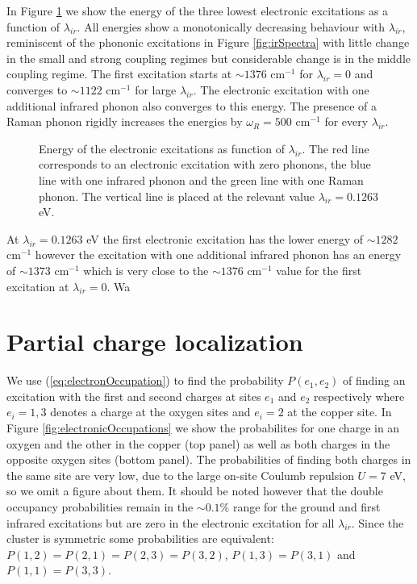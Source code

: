 In Figure \ref{fig:electrSpectra} we show the energy of the three lowest electronic excitations as a function of $\lambda_{ir}$.
All energies show a monotonically decreasing behaviour with $\lambda_{ir}$, reminiscent of the phononic excitations in Figure \ref{fig:irSpectra} with little change in the small and strong coupling regimes but considerable change is in the middle coupling regime.
The first excitation starts at $\sim 1376$ cm$^{-1}$ for $\lambda_{ir}=0$ and converges to $\sim 1122$ cm$^{-1}$ for large $\lambda_{ir}$.
The electronic excitation with one additional infrared phonon also converges to this energy.
The presence of a Raman phonon rigidly increases the energies by $\omega_R=500$ cm$^{-1}$ for every $\lambda_{ir}$.
%
\begin{figure}[ht]
  \centering
  
  \caption[Energy of the electronic excitations as function of $\lambda_{ir}$.]
  {Energy of the electronic excitations as function of $\lambda_{ir}$. 
    The red line corresponds to an electronic excitation with zero phonons, the blue line with one infrared phonon and the green line with one Raman phonon.
    The vertical line is placed at the relevant value $\lambda_{ir}=0.1263$ eV.}
  \label{fig:electrSpectra}
\end{figure}

At $\lambda_{ir}=0.1263$ eV the first electronic excitation has the lower energy of $\sim 1282$ cm$^{-1}$ however the excitation with one additional infrared phonon has an energy of $\sim 1373$ cm$^{-1}$ which is very close to the $\sim 1376$ cm$^{-1}$ value for the first excitation at $\lambda_{ir}=0$.
Wa
\section{Partial charge localization}
\label{sec:partialChargeLocalization}

We use (\ref{eq:electronOccupation}) to find the probability $P(e_1,e_2)$ of finding an excitation with the first and second charges at sites $e_1$ and $e_2$ respectively where $e_i=1,3$ denotes a charge at the oxygen sites and $e_i=2$ at the copper site.
In Figure \ref{fig:electronicOccupations} we show the probabilites for one charge in an oxygen and the other in the copper (top panel) as well as both charges in the opposite oxygen sites (bottom panel).
The probabilities of finding both charges in the same site are very low, due to the large on-site Coulumb repulsion $U=7$ eV, so we omit a figure about them.
It should be noted however that the double occupancy probabilities remain in the $\sim 0.1$\% range for the ground and first infrared excitations but are zero in the electronic excitation for all $\lambda_{ir}$.
Since the cluster is symmetric some probabilities are equivalent: $P(1,2)=P(2,1)=P(2,3)=P(3,2)$, $P(1,3)=P(3,1)$ and $P(1,1)=P(3,3)$.

